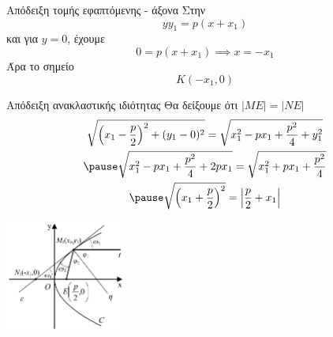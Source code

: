 \documentclass[greek]{beamer}
\begin{document}
\begin{frame}[label=Απόδειξη1]{Απόδειξη τομής εφαπτόμενης - άξονα}
 Στην
 $$yy_1=p(x+x_1)$$
 και για $y=0$, έχουμε
 $$0=p(x+x_1)\implies x=-x_1$$
 Άρα το σημείο $$Κ(-x_1,0)$$
 \hyperlink{Ιδιότητες}{}
\end{frame}

\begin{frame}[label=Απόδειξη2]{Απόδειξη ανακλαστικής ιδιότητας}
 Θα δείξουμε ότι $|ΜΕ|=|ΝΕ|$
 \begin{gather*}
  \sqrt{\left( x_1-\frac{p}{2} \right)^2+(y_1-0)^2 }=\sqrt{x_1^2-px_1+\frac{p^2}{4}+y_1^2 } \\ \pause
  \sqrt{x_1^2-px_1+\frac{p^2}{4}+2px_1 }=\sqrt{x_1^2+px_1+\frac{p^2}{4} } \\ \pause
  \sqrt{\left( x_1+\frac{p}{2} \right)^2}=\left| \frac{p}{2}+x_1 \right|
 \end{gather*}

 \centering
 \includegraphics[width=0.3\textwidth]{"../images/reflection.png"}

 \hyperlink{Ιδιότητες}{}
\end{frame}
\end{document}
